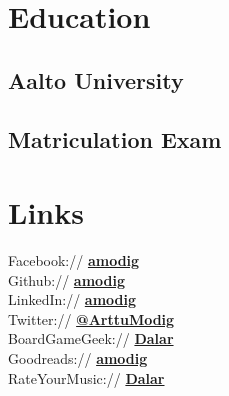 \documentclass[]{deedy-resume-openfont}
\begin{document}
%
%
\lastupdated

%
%

%
%

\begin{minipage}[t]{0.33\textwidth} 


\section{Education} 

\subsection{Aalto University}
\vspace{0.5em}
\sectionsep

\subsection{Matriculation Exam}
\sectionsep


\section{Links} 
Facebook:// \href{https://facebook.com/amodig}{\bf amodig} \\
Github:// \href{https://github.com/amodig}{\bf amodig} \\
LinkedIn:// \href{https://www.linkedin.com/in/amodig}{\bf amodig} \\
Twitter:// \href{https://twitter.com/ArttuModig}{\bf @ArttuModig} \\
\sectionsep
BoardGameGeek:// \href{https://boardgamegeek.com/user/dalar}{\bf Dalar} \\
Goodreads:// \href{https://goodreads.com/amodig}{\bf amodig} \\
RateYourMusic:// \href{https://rateyourmusic.com/~Dalar}{\bf Dalar} \\
\sectionsep


\end{minipage}
\end{document}

